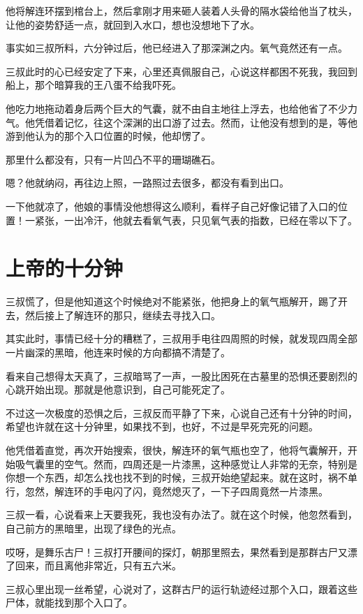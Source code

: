 他将解连环摆到棺台上，然后拿刚才用来砸人装着人头骨的隔水袋给他当了枕头，让他的姿势舒适一点，就回到入水口，想也没想地下了水。

事实如三叔所料，六分钟过后，他已经进入了那深渊之内。氧气竟然还有一点。

三叔此时的心已经安定了下来，心里还真佩服自己，心说这样都困不死我，我回到船上，那个暗算我的王八蛋不给我吓死。

他吃力地拖动着身后两个巨大的气囊，就不由自主地往上浮去，也给他省了不少力气。他凭借着记忆，往这个深渊的出口游了过去。然而，让他没有想到的是，等他游到他认为的那个入口位置的时候，他却愣了。

那里什么都没有，只有一片凹凸不平的珊瑚礁石。

嗯？他就纳闷，再往边上照，一路照过去很多，都没有看到出口。

一下他就凉了，他娘的事情没他想得这么顺利，看样子自己好像记错了入口的位置！一紧张，一出冷汗，他就去看氧气表，只见氧气表的指数，已经在零以下了。

\chapter{上帝的十分钟}

三叔慌了，但是他知道这个时候绝对不能紧张，他把身上的氧气瓶解开，踢了开去，然后接上了解连环的那只，继续去寻找入口。

其实此时，事情已经十分的糟糕了，三叔用手电往四周照的时候，就发现四周全部一片幽深的黑暗，他连来时候的方向都搞不清楚了。

看来自己想得太天真了，三叔暗骂了一声，一股比困死在古墓里的恐惧还要剧烈的心跳开始出现。那就是他意识到，自己可能死定了。

不过这一次极度的恐惧之后，三叔反而平静了下来，心说自己还有十分钟的时间，希望也许就在这十分钟里，如果找不到，也好，不过是早死完死的问题。

他凭借着直觉，再次开始搜索，很快，解连环的氧气瓶也空了，他将气囊解开，开始吸气囊里的空气。然而，四周还是一片漆黑，这种感觉让人非常的无奈，特别是你想一个东西，却怎么找也找不到的时候，三叔开始绝望起来。就在这时，祸不单行，忽然，解连环的手电闪了闪，竟然熄灭了，一下子四周竟然一片漆黑。

三叔一看，心说看来上天要我死，我也没有办法了。就在这个时候，他忽然看到，自己前方的黑暗里，出现了绿色的光点。

哎呀，是舞乐古尸！三叔打开腰间的探灯，朝那里照去，果然看到是那群古尸又漂了回来，而且离他非常近，只有五六米。

三叔心里出现一丝希望，心说对了，这群古尸的运行轨迹经过那个入口，跟着这些尸体，就能找到那个入口了。

